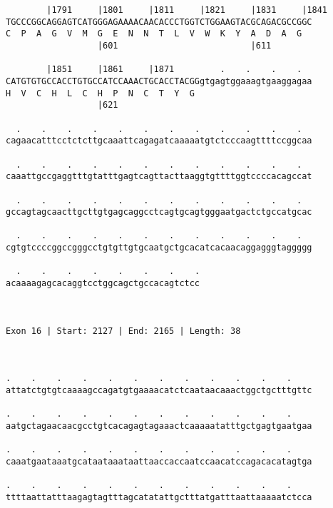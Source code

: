 \documentclass{article}
\begin{document}
\begin{Verbatim}
        |1791     |1801     |1811     |1821     |1831     |1841
TGCCCGGCAGGAGTCATGGGAGAAAACAACACCCTGGTCTGGAAGTACGCAGACGCCGGC
C  P  A  G  V  M  G  E  N  N  T  L  V  W  K  Y  A  D  A  G  
                  |601                          |611        
  
        |1851     |1861     |1871         .    .    .    .  
CATGTGTGCCACCTGTGCCATCCAAACTGCACCTACGGgtgagtggaaagtgaaggagaa
H  V  C  H  L  C  H  P  N  C  T  Y  G                       
                  |621                                      
  
  .    .    .    .    .    .    .    .    .    .    .    .  
cagaacatttcctctcttgcaaattcagagatcaaaaatgtctcccaagttttccggcaa
                                                            
  .    .    .    .    .    .    .    .    .    .    .    .  
caaattgccgaggtttgtatttgagtcagttacttaaggtgttttggtccccacagccat
                                                            
  .    .    .    .    .    .    .    .    .    .    .    .  
gccagtagcaacttgcttgtgagcaggcctcagtgcagtgggaatgactctgccatgcac
                                                            
  .    .    .    .    .    .    .    .    .    .    .    .  
cgtgtccccggccgggcctgtgttgtgcaatgctgcacatcacaacaggagggtaggggg
                                                            
  .    .    .    .    .    .    .    .
acaaaagagcacaggtcctggcagctgccacagtctcc
                                      
                                      
 
Exon 16 | Start: 2127 | End: 2165 | Length: 38



.    .    .    .    .    .    .    .    .    .    .    .    
attatctgtgtcaaaagccagatgtgaaaacatctcaataacaaactggctgctttgttc
                                                            
.    .    .    .    .    .    .    .    .    .    .    .    
aatgctagaacaacgcctgtcacagagtagaaactcaaaaatatttgctgagtgaatgaa
                                                            
.    .    .    .    .    .    .    .    .    .    .    .    
caaatgaataaatgcataataaataattaaccaccaatccaacatccagacacatagtga
                                                            
.    .    .    .    .    .    .    .    .    .    .    .    
ttttaattatttaagagtagtttagcatatattgctttatgatttaattaaaaatctcca
                                                            

\end{Verbatim}
\end{document}
